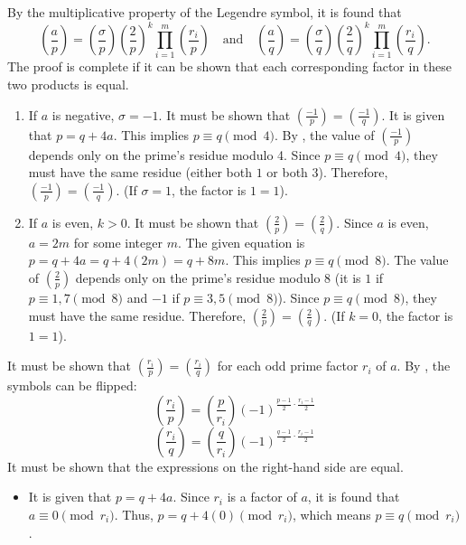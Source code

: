 \begin{enumerate}
\begin{subprove}
    By the multiplicative property of the Legendre symbol, it is found that
    \[
      \left(\frac{a}{p}\right) = \left(\frac{\sigma}{p}\right) \left(\frac{2}{p}\right)^k \prod_{i=1}^m \left(\frac{r_i}{p}\right)
      \quad \text{and} \quad
      \left(\frac{a}{q}\right) = \left(\frac{\sigma}{q}\right) \left(\frac{2}{q}\right)^k \prod_{i=1}^m \left(\frac{r_i}{q}\right).
    \]
    The proof is complete if it can be shown that each corresponding factor in these two products is equal.
    \begin{enumerate}
      \item 
      If $a$ is negative, $\sigma = -1$. It must be shown that $\left(\frac{-1}{p}\right) = \left(\frac{-1}{q}\right)$.
      It is given that $p = q + 4a$. This implies $p \equiv q \pmod 4$.
      By , the value of $\left(\frac{-1}{p}\right)$ depends only on the prime's residue modulo 4. Since $p \equiv q \pmod 4$, they must have the same residue (either both $1$ or both $3$).
      Therefore, $\left(\frac{-1}{p}\right) = \left(\frac{-1}{q}\right)$. (If $\sigma=1$, the factor is $1=1$).
      \item  
      If $a$ is even, $k > 0$. It must be shown that $\left(\frac{2}{p}\right) = \left(\frac{2}{q}\right)$.
      Since $a$ is even, $a = 2m$ for some integer $m$.
      The given equation is $p = q + 4a = q + 4(2m) = q + 8m$.
      This implies $p \equiv q \pmod 8$.
      The value of $\left(\frac{2}{p}\right)$ depends only on the prime's residue modulo 8 (it is $1$ if $p \equiv 1, 7 \pmod 8$ and $-1$ if $p \equiv 3, 5 \pmod 8$).
      Since $p \equiv q \pmod 8$, they must have the same residue.
      Therefore, $\left(\frac{2}{p}\right) = \left(\frac{2}{q}\right)$. (If $k=0$, the factor is $1=1$).
    \end{enumerate}
    It must be shown that $\left(\frac{r_i}{p}\right) = \left(\frac{r_i}{q}\right)$ for each odd prime factor $r_i$ of $a$.
    By , the symbols can be flipped:
    \[
      \left(\frac{r_i}{p}\right) = \left(\frac{p}{r_i}\right) (-1)^{\frac{p-1}{2} \cdot \frac{r_i-1}{2}}
    \]
    \[
      \left(\frac{r_i}{q}\right) = \left(\frac{q}{r_i}\right) (-1)^{\frac{q-1}{2} \cdot \frac{r_i-1}{2}}
    \]
    It must be shown that the expressions on the right-hand side are equal.
    \begin{itemize}
        \item 
        It is given that $p = q + 4a$. Since $r_i$ is a factor of $a$, it is found that $a \equiv 0 \pmod{r_i}$.
        Thus, $p = q + 4(0) \pmod{r_i}$, which means $p \equiv q \pmod{r_i}$.

\end{itemize}
\end{subprove}
\end{enumerate}
